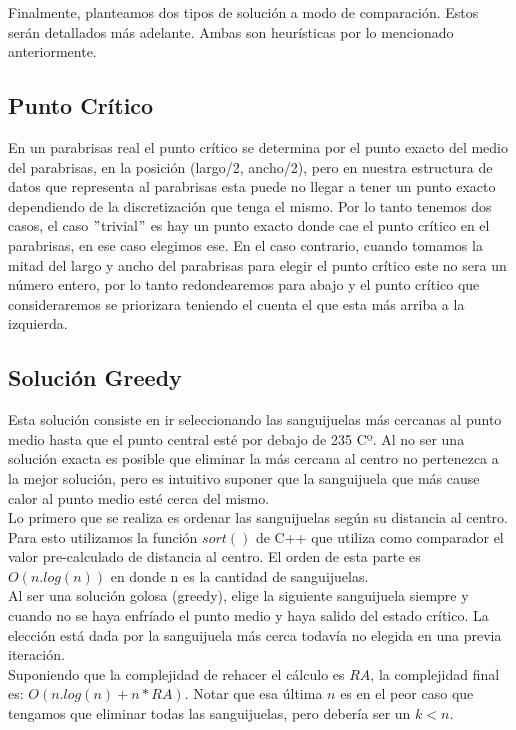 Finalmente, planteamos dos tipos de solución a modo de comparación. Estos serán detallados más adelante. Ambas son heurísticas por lo mencionado anteriormente.

\subsection{Punto Crítico}
En un parabrisas real el punto crítico se determina por el punto exacto del medio del parabrisas, en la posición (largo/2, ancho/2), pero en nuestra estructura de datos que representa al parabrisas esta puede no llegar a tener un punto exacto dependiendo de la discretización que tenga el mismo. Por lo tanto tenemos dos casos, el caso $"$trivial$"$ es hay un punto exacto donde cae el punto crítico en el parabrisas, en ese caso elegimos ese. En el caso contrario, cuando tomamos la mitad del largo y ancho del parabrisas para elegir el punto crítico este no sera un número entero, por lo tanto redondearemos para abajo y el punto crítico que consideraremos se priorizara teniendo el cuenta el que esta más arriba a la izquierda.

\subsection{Solución Greedy}
Esta solución consiste en ir seleccionando las sanguijuelas más cercanas al punto medio hasta que el punto central esté por debajo de 235 Cº. Al no ser una solución exacta es posible que eliminar la más cercana al centro no pertenezca a la mejor solución, pero es intuitivo suponer que la sanguijuela que más cause calor al punto medio esté cerca del mismo. \\
Lo primero que se realiza es ordenar las sanguijuelas según su distancia al centro. Para esto utilizamos la función $sort()$ de C++ que utiliza como comparador el valor pre-calculado de distancia al centro. El orden de esta parte es $O(n.log(n))$ en donde n es la cantidad de sanguijuelas.\\
Al ser una solución golosa (greedy), elige la siguiente sanguijuela siempre y cuando no se haya enfríado el punto medio y haya salido del estado crítico. La elección está dada por la sanguijuela más cerca todavía no elegida en una previa iteración.\\
Suponiendo que la complejidad de rehacer el cálculo es $RA$, la complejidad final es:  $O(n.log(n) + n*RA)$. Notar que esa última $n$ es en el peor caso que tengamos que eliminar todas las sanguijuelas, pero debería ser un $k < n$.

